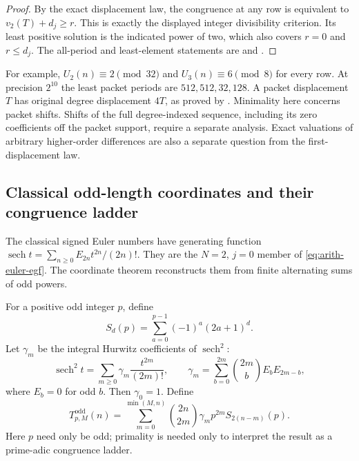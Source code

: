 \begin{proof}
By the exact displacement law, the congruence at any row is equivalent to
$v_2(T)+d_j\ge r$.  This is exactly the displayed integer
divisibility criterion.  Its least positive solution is the indicated
power of two, which also covers $r=0$ and $r\le d_j$.
The all-period and least-element statements are
 and
.
\end{proof}

For example, $U_2(n)\equiv2\pmod{32}$ and $U_3(n)\equiv6\pmod8$
for every row.  At precision $2^{10}$ the least packet periods are
$512,512,32,128$.  A packet displacement $T$ has original degree
displacement $4T$, as proved by
.
Minimality here concerns packet shifts.  Shifts of the full degree-indexed
sequence, including its zero coefficients off the packet support, require
a separate analysis.  Exact valuations of arbitrary higher-order differences
are also a separate question from the first-displacement law.

\subsection{Classical odd-length coordinates and their congruence ladder}

The classical signed Euler numbers have generating function
$\operatorname{sech}t=\sum_{n\ge0}E_{2n}t^{2n}/(2n)!$.
They are the $N=2$, $j=0$ member of
\eqref{eq:arith-euler-egf}.  The coordinate theorem reconstructs
them from finite alternating sums of odd powers.

\begin{definition}
\label{def:arith-odd-source}
For a positive odd integer $p$, define
\[
 S_d(p)=\sum_{a=0}^{p-1}(-1)^a(2a+1)^d.
\]
Let $\gamma_m$ be the integral Hurwitz coefficients of $\operatorname{sech}^2$:
\[
 \operatorname{sech}^2t=\sum_{m\ge0}\gamma_m\frac{t^{2m}}{(2m)!},
 \qquad
 \gamma_m=\sum_{b=0}^{2m}\binom{2m}{b}E_bE_{2m-b},
\]
where $E_b=0$ for odd $b$.  Then $\gamma_0=1$.  Define
\[
 T^{\mathrm{odd}}_{p,M}(n)=\sum_{m=0}^{\min(M,n)}
       \binom{2n}{2m}\gamma_m p^{2m}S_{2(n-m)}(p).
\]
Here $p$ need only be odd; primality is needed only to interpret the
result as a prime-adic congruence ladder.
\end{definition}

